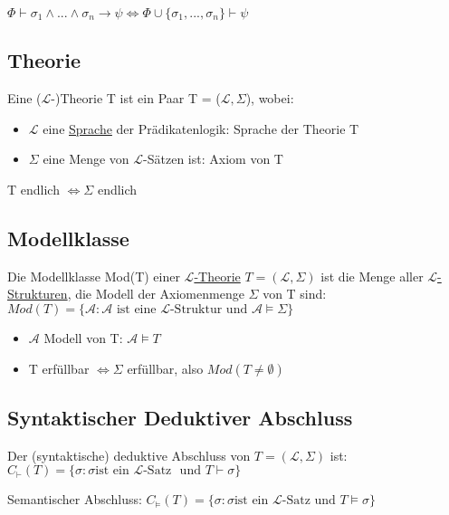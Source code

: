 \documentclass[12pt,a4paper]{article} %
\begin{document}
	$\Phi \hyperref[Beweisbar]{\vdash} \sigma_1 \land ... \land \sigma_n \rightarrow \psi \Leftrightarrow \Phi \cup \{\sigma_1, ..., \sigma_n\} \hyperref[Beweisbar]{\vdash} \psi$
	
	\subsection{Theorie}
	\label{Theorie}
	Eine ($\mathcal{L}$-)Theorie T ist ein Paar T = ($\mathcal{L}, \Sigma$), wobei:
	\begin{itemize}
		\item $\mathcal{L}$ eine \hyperref[PLSprache]{Sprache} der Prädikatenlogik: Sprache der Theorie T
		\item $\Sigma$ eine Menge von $\mathcal{L}$-Sätzen ist: Axiom von T
	\end{itemize}
	T endlich $\Leftrightarrow \Sigma$ endlich
	
	\subsection{Modellklasse}
	Die Modellklasse Mod(T) einer \hyperref[Theorie]{$\mathcal{L}$-Theorie} $T = (\mathcal{L}, \Sigma)$ ist die Menge aller \hyperref[Struktur]{$\mathcal{L}$-Strukturen}, die Modell der Axiomenmenge $\Sigma$ von T sind: $Mod(T) = \{\mathcal{A} : \mathcal{A} \text{ ist eine } \hyperref[Struktur]{\mathcal{L} \text{-Struktur und } \mathcal{A}} \hyperref[Erfullbar]{\vDash} \Sigma\}$
	\begin{itemize}
		\item $\mathcal{A}$ Modell von T: $\mathcal{A} \hyperref[Erfullbar]{\vDash} T$
		\item T erfüllbar $\Leftrightarrow \Sigma$ erfüllbar, also $Mod(T \ne \emptyset)$
	\end{itemize}
	
	\subsection{Syntaktischer Deduktiver Abschluss}
	Der (syntaktische) deduktive Abschluss von $T = (\mathcal{L}, \Sigma)$ ist: \newline 
	$C_{\vdash}(T) = \{\sigma : \sigma \text{ist ein } \hyperref[LSatz]{\mathcal{L} \text{-Satz }} \text{ und } T \hyperref[Beweisbar]{\vdash} \sigma\}$
	
	Semantischer Abschluss: \newline
	$C_{\vDash}(T) = \{\sigma : \sigma \text{ist ein } \hyperref[LSatz]{\mathcal{L} \text{-Satz}} \text{ und } T \hyperref[Erfullbar]{\vDash} \sigma\}$
	
\end{document}
